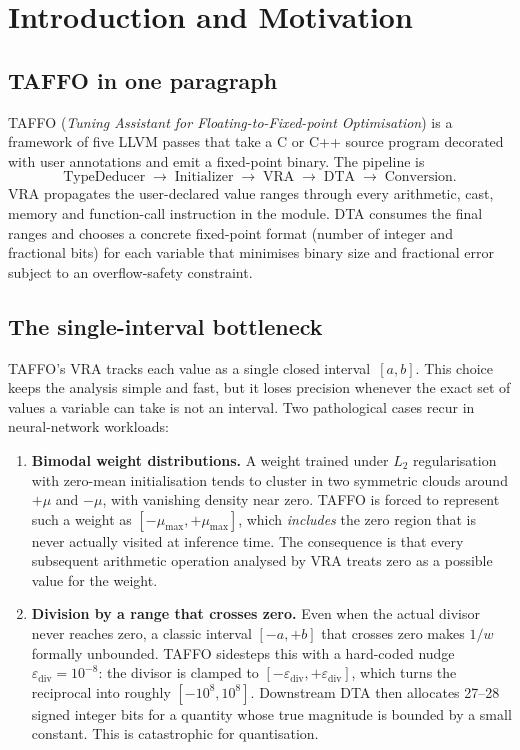 \documentclass[11pt,a4paper]{article}
\theoremstyle{plain}
\begin{document}
\section{Introduction and Motivation}
\label{sec:intro}

\subsection{TAFFO in one paragraph}

TAFFO (\emph{Tuning Assistant for Floating-to-Fixed-point
Optimisation}) is a framework of five LLVM passes that take a C or C++
source program decorated with user annotations and emit a fixed-point
binary. The pipeline is
\[
\text{TypeDeducer}\;\to\;\text{Initializer}\;\to\;\text{VRA}\;\to\;\text{DTA}\;\to\;\text{Conversion}.
\]
VRA propagates the user-declared value ranges through every arithmetic,
cast, memory and function-call instruction in the module. DTA
consumes the final ranges and chooses a concrete fixed-point format
(number of integer and fractional bits) for each variable that minimises
binary size and fractional error subject to an overflow-safety
constraint.

\subsection{The single-interval bottleneck}
\label{sec:bottleneck}

TAFFO's VRA tracks each value as a single closed interval~$[a,b]$. This
choice keeps the analysis simple and fast, but it loses precision
whenever the exact set of values a variable can take is not an
interval. Two pathological cases recur in neural-network workloads:

\begin{enumerate}
\item \textbf{Bimodal weight distributions.} A weight trained under
  $L_2$ regularisation with zero-mean initialisation tends to cluster in
  two symmetric clouds around $+\mu$ and $-\mu$, with vanishing density
  near zero. TAFFO is forced to represent such a weight as
  $[-\mu_{\max},+\mu_{\max}]$, which \emph{includes} the zero region
  that is never actually visited at inference time. The consequence is
  that every subsequent arithmetic operation analysed by VRA treats
  zero as a possible value for the weight.
\item \textbf{Division by a range that crosses zero.} Even when the
  actual divisor never reaches zero, a classic interval $[-a,+b]$ that
  crosses zero makes $1/w$ formally unbounded. TAFFO sidesteps this
  with a hard-coded nudge $\varepsilon_{\text{div}}=10^{-8}$: the
  divisor is clamped to $[-\varepsilon_{\text{div}},+\varepsilon_{\text{div}}]$,
  which turns the reciprocal into roughly $[-10^8, 10^8]$. Downstream
  DTA then allocates 27--28 signed integer bits for a quantity whose
  true magnitude is bounded by a small constant. This is catastrophic
  for quantisation.
\end{enumerate}
\end{document}
